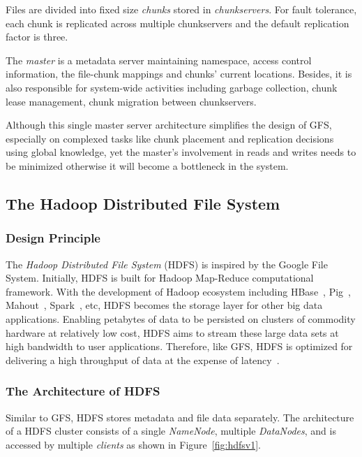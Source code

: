 \noindent Files are divided into fixed size \textit{chunks} stored in \textit{chunkservers}. For fault tolerance, each chunk is replicated across multiple chunkservers and the default replication factor is three.

\noindent The \textit{master} is a metadata server maintaining namespace, access control information, the file-chunk mappings and chunks' current locations. Besides, it is also responsible for system-wide activities including garbage collection, chunk lease management, chunk migration between chunkservers.

\noindent Although this single master server architecture simplifies the design of GFS, especially on complexed tasks like chunk placement and replication decisions using global knowledge, yet the master's involvement in reads and writes needs to be minimized otherwise it will become a bottleneck in the system.

\subsection{The Hadoop Distributed File System}

\subsubsection{Design Principle}
The \textit{Hadoop Distributed File System} (HDFS) is inspired by the Google File System. Initially, HDFS is built for Hadoop Map-Reduce computational framework. With the development of Hadoop ecosystem including HBase~\cite{apachehbase}, Pig~\cite{apachepig}, Mahout~\cite{apachemahout}, Spark~\cite{apachespark}, etc, HDFS becomes the storage layer for other big data applications. Enabling petabytes of data to be persisted on clusters of commodity hardware at relatively low cost, HDFS aims to stream these large data sets at high bandwidth to user applications. Therefore, like GFS, HDFS is optimized for delivering a high throughput of data at the expense of latency~\cite{white2012hadoop}.

\subsubsection{The Architecture of HDFS}
\noindent Similar to GFS, HDFS stores metadata and file data separately. The architecture of a HDFS cluster consists of a single \textit{NameNode}, multiple \textit{DataNodes}, and is accessed by multiple \textit{clients} as shown in Figure~\ref{fig:hdfsv1}.

